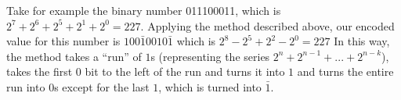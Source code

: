 \documentclass{article}
\begin{document}
Take for example the binary number 011100011, which is $2^7 + 2^6 + 2^5 + 2^1 + 2^0 = 227$.
Applying the method described above, our encoded value for this number is $100\bar{1}0010\bar{1}$ which is $2^8 - 2^5 + 2^2 - 2^0 = 227$
In this way, the method takes a ``run'' of $1$s (representing the series $2^{n} + 2^{n-1} + ...
+ 2^{n-k}$), takes the first 0 bit to the left of the run and turns it into $1$ and turns the entire run into $0$s except for the last $1$, which is turned into $\bar{1}$.






\end{document}
